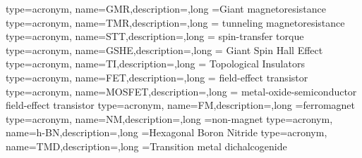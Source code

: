 {type=acronym, name={GMR},description={},long ={Giant magnetoresistance}
}
{type=acronym, name={TMR},description={},long ={ tunneling magnetoresistance}
}
{type=acronym, name={STT},description={},long ={ spin-transfer torque}
}
{type=acronym, name={GSHE},description={},long ={  Giant Spin Hall Effect}
}
{type=acronym, name={TI},description={},long ={  Topological Insulators}
}
{type=acronym, name={FET},description={},long ={  field-effect transistor}
}
{type=acronym, name={MOSFET},description={},long ={  metal-oxide-semiconductor field-effect transistor}
}
{type=acronym, name={FM},description={},long ={ferromagnet}
}
{type=acronym, name={NM},description={},long ={non-magnet}
}
{type=acronym, name={h-BN},description={},long ={Hexagonal Boron Nitride}
}
{type=acronym, name={TMD},description={},long ={Transition metal dichalcogenide}
}

